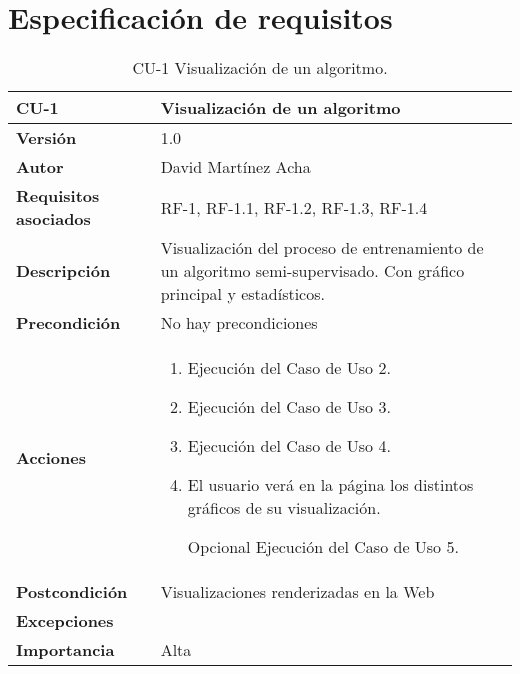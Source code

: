 \section{Especificación de requisitos}


\begin{table}[p]
	\centering
	\begin{tabularx}{\linewidth}{ p{} p{} }
		\toprule
		\textbf{CU-1}    & \textbf{Visualización de un algoritmo}\\
		\toprule
		\textbf{Versión}              & 1.0    \\
		\textbf{Autor}                & David Martínez Acha \\
		\textbf{Requisitos asociados} & RF-1, RF-1.1, RF-1.2, RF-1.3, RF-1.4 \\
		\textbf{Descripción}          & Visualización del proceso de entrenamiento de un algoritmo semi-supervisado. Con gráfico principal y estadísticos. \\
		\textbf{Precondición}         & No hay precondiciones \\
		\textbf{Acciones}             &
		\begin{enumerate}
			\def\labelenumi{\arabic{enumi}.}
			\tightlist
			\item Ejecución del Caso de Uso 2.
			\item Ejecución del Caso de Uso 3.
            \item Ejecución del Caso de Uso 4.
            \item El usuario verá en la página los distintos gráficos de su visualización. 
            \item [Opcional] Ejecución del Caso de Uso 5.
		\end{enumerate}\\
		\textbf{Postcondición}        & Visualizaciones renderizadas en la Web \\
		\textbf{Excepciones}          &  \\
		\textbf{Importancia}          & Alta\\
		\bottomrule
	\end{tabularx}
	\caption{CU-1 Visualización de un algoritmo.}
\end{table}

